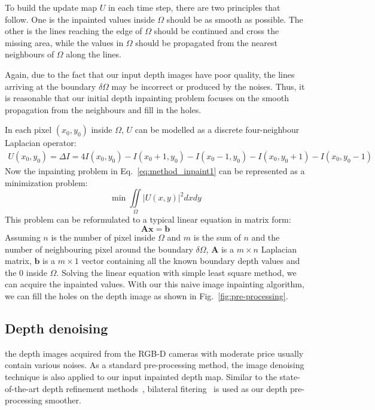 To build the update map $U$ in each time step, there are two principles that~\cite{bertalmio2000image} follow.
One is the inpainted values inside $\Omega$ should be as smooth as possible. 
The other is the lines reaching the edge of $\Omega$ should be continued and cross the missing area, while the values in $\Omega$ should be propagated from the nearest neighbours of $\Omega$ along the lines.

Again, due to the fact that our input depth images have poor quality, the lines arriving at the boundary $\delta \Omega$ may be incorrect or produced by the noises.
Thus, it is reasonable that our initial depth inpainting problem focuses on the smooth propagation from the neighbours and fill in the holes.

In each pixel $(x_0, y_0)$ inside $\Omega$, $U$ can be modelled as a discrete four-neighbour Laplacian operator:
\begin{equation}
\begin{split}
U(x_0, y_0) = \Delta I
		        = 4I(x_0, y_0) - I(x_0 + 1, y_0) - I(x_0 - 1, y_0) - I(x_0, y_0+1) - I(x_0 , y_0 -1)
\end{split}
\end{equation}
Now the inpainting problem in Eq.~\ref{eq:method_inpaint1} can be represented as a minimization problem: 
\begin{equation}
\min \iint\limits_{\Omega} |U(x,y)|^2 dxdy 
\end{equation}
This problem can be reformulated to a typical linear equation in matrix form:
\begin{equation}
\mathbf{Ax=b}
\end{equation}
Assuming $n$ is the number of pixel inside $\Omega$ and $m$ is the sum of $n$ and the number of neighbouring pixel around the boundary $\delta \Omega$, $\mathbf{A}$ is a $m\times n$ Laplacian matrix, $\mathbf{b}$ is a $m\times1$ vector containing all the known boundary depth values and the $0$ inside $\Omega$.
Solving the linear equation with simple least square method, we can acquire the inpainted values.
With our this naive image inpainting algorithm, we can fill the holes on the depth image as shown in Fig.~\ref{fig:pre-processing}.

\subsection{Depth denoising}
the depth images acquired from the RGB-D cameras with moderate price usually contain various noises. 
As a standard pre-processing method, the image denoising technique is also applied to our input inpainted depth map.
Similar to the state-of-the-art depth refinement methods~\cite{zhang2012edge, or2015rgbd, han2013high, or2016real, haque2014high, yu2013shading}, bilateral fitering~\cite{tomasi1998bilateral} is used as our depth pre-processing smoother. 

